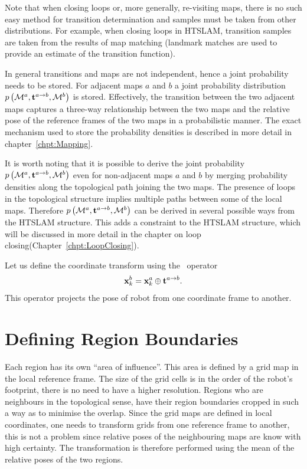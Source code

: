 Note that when closing loops or, more generally, re-visiting maps,
there is no such easy method for transition determination and samples
must be taken from other distributions. For example, when closing
loops in HTSLAM, transition samples are taken from the results of map
matching (landmark matches are used to provide an estimate of
the transition function).

In general transitions and maps are not independent,
hence a joint probability needs to be stored. For adjacent maps $a$
and $b$ a joint probability distribution
$\prob{\map{}{}{a},\tr{}{a}{b}, \map{}{}{b}}$ is stored. Effectively,
the transition between the two adjacent maps captures a three-way
relationship between the two maps and the relative pose of the
reference frames of the two maps in a probabilistic manner. The exact
mechanism used to store the probability densities is described in more
detail in chapter~\ref{chpt:Mapping}.

It is worth noting that it is possible to derive the joint
probability $\prob{\map{}{}{a},\tr{}{a}{b},\map{}{}{b}}$ even for
non-adjacent maps $a$ and $b$ by merging probability densities along
the topological path joining the two maps.  The presence of loops in
the topological structure implies multiple paths between some of the
local maps. Therefore $\prob{\map{}{}{a},\tr{}{a}{b},\map{}{}{b}}$ can
be derived in several possible ways from the HTSLAM structure. This
adds a constraint to the HTSLAM structure, which will be discussed in
more detail in the chapter on loop closing(Chapter~\ref{chpt:LoopClosing}).

Let us define the coordinate transform using the \transit\ operator
\begin{equation}
\x{k}{}{b} = \x{k}{}{a} \transit \tr{}{a}{b}.
\end{equation}
This operator projects the pose of robot from one coordinate frame to
another.


\section{Defining Region Boundaries}
\label{sec:region}

Each region has its own ``area of influence''. This area is defined by
a grid map in the local reference frame. The size of the grid cells is
in the order of the robot's footprint, there is no need to have a
higher resolution. Regions who are neighbours in the topological
sense, have their region boundaries cropped in such a way as to
minimise the overlap. Since the grid maps are defined in local
coordinates, one needs to transform grids from one reference frame to
another, this is not a problem since relative poses of the
neighbouring maps are know with high certainty. The transformation is
therefore performed using the mean of the relative poses of the two
regions.


